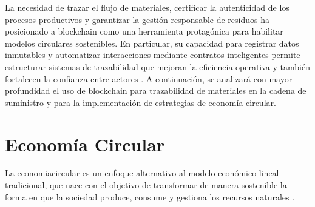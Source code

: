 La necesidad de trazar el flujo de materiales, certificar la autenticidad de los procesos productivos y garantizar la gestión responsable de residuos ha posicionado a blockchain como una herramienta protagónica para habilitar modelos circulares sostenibles. En particular, su capacidad para registrar datos inmutables y automatizar interacciones mediante contratos inteligentes permite estructurar sistemas de trazabilidad que mejoran la eficiencia operativa y también fortalecen la confianza entre actores \cite{sharabati2024blockchain, rejeb2023role}. A continuación, se analizará con mayor profundidad el uso de blockchain para trazabilidad de materiales en la cadena de suministro y para la implementación de estrategias de economía circular.

\section{Economía Circular}
\label{sec:circular-economy}

La \gls{economiacircular} es un enfoque alternativo al modelo económico lineal tradicional, que nace con el objetivo de transformar de manera sostenible la forma en que la sociedad produce, consume y gestiona los recursos naturales \cite{espanacircular2030}.

